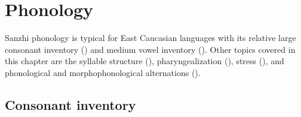 \chapter{Phonology}
\label{cpt:phonology}

Sanzhi phonology is typical for East Caucasian languages with its relative large consonant inventory () and medium vowel inventory (). Other topics covered in this chapter are the syllable structure (), pharyngealization (), stress (), and phonological and morphophonological alternations (). 



\section{Consonant inventory}
\label{sec:Consonant inventory}


